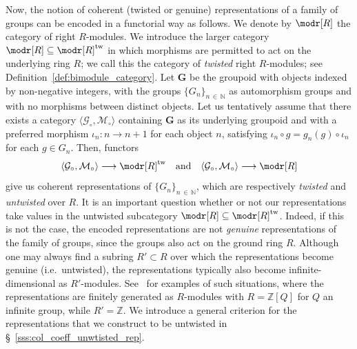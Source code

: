 \documentclass[AHL,Unicode,published]{cedram}
\newcommand{\tw}{\mathrm{tw}}
\newcommand{\fG}{\mathbf{G}}
\newcommand{\cG}{\mathcal{G}}
\newcommand{\cM}{\mathcal{M}}
\newcommand{\bN}{\mathbb{N}}
\newcommand{\bZ}{\mathbb{Z}}
\newcommand{\too}{\ensuremath{\longrightarrow}}
\begin{document}
Now, the notion of coherent (twisted or genuine) representations of a family of groups can be encoded in a functorial way as follows. We denote by $\modr[R]$ the category of right $R$-modules. We introduce the larger category $\modr[R]\subseteq \modr[R]^{\tw}$ in which morphisms are permitted to act on the underlying ring $R$; we call this the category of \emph{twisted} right $R$-modules; see Definition~\ref{def:bimodule_category}. Let $\fG$ be the groupoid with objects indexed by non-negative integers, with the groups $\{G_{n}\}_{n\,\in\,\bN}$ as automorphism groups and with no morphisms between distinct objects. Let us tentatively assume that there exists a category $\langle \cG_{\circ}, \cM_{\circ} \rangle$ containing $\fG$ as its underlying groupoid and with a preferred morphism $\iota_{n} \colon n\rightarrow n+1$ for each object $n$, satisfying $\iota_{n} \circ g = g_{n}(g) \circ \iota_{n}$ for each $g \in G_{n}$. Then, functors
\begin{equation}\label{eq:coherent_rep_functors}
\langle \cG_{\circ}, \cM_{\circ} \rangle \too \modr[R]^{\tw} \quad \text{and} \quad \langle \cG_{\circ}, \cM_{\circ} \rangle \too \modr[R]
\end{equation}
give us coherent representations of $\{G_{n}\}_{n\,\in\,\bN}$, which are respectively \emph{twisted} and \emph{untwisted} over $R$. It is an important question whether or not our representations take values in the untwisted subcategory $\modr[R]\subseteq \modr[R]^{\tw}$. Indeed, if this is not the case, the encoded representations are not \emph{genuine} representations of the family of groups, since the groups also act on the ground ring $R$. Although one may always find a subring $R'\subset R$ over which the representations become genuine (i.e.~untwisted), the representations typically also become infinite-dimensional as $R'$-modules. See~\cite{BPS,PSIIp} for examples of such situations, where the representations are finitely generated as $R$-modules with $R=\bZ[Q]$ for $Q$ an infinite group, while $R'=\bZ$. We introduce a general criterion for the representations that we construct to be untwisted in
\S~\ref{sss:col_coeff_unwtisted_rep}.
\end{document}
